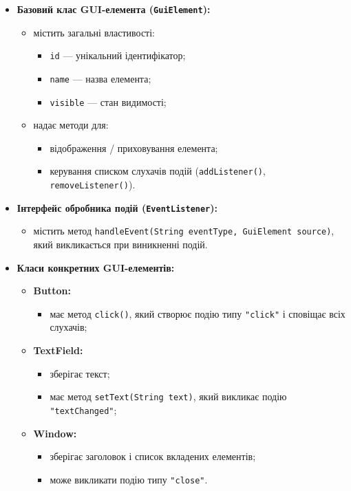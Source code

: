 \documentclass[12pt,a4paper]{article}
\begin{document}
    \begin{itemize}
    \item \textbf{Базовий клас GUI-елемента (\texttt{GuiElement}):}
    \begin{itemize}
        \item містить загальні властивості:
        \begin{itemize}
        \item \texttt{id} — унікальний ідентифікатор;
        \item \texttt{name} — назва елемента;
        \item \texttt{visible} — стан видимості;
        \end{itemize}
        \item надає методи для:
        \begin{itemize}
        \item відображення / приховування елемента;
        \item керування списком слухачів подій (\texttt{addListener()}, \texttt{removeListener()}).
        \end{itemize}
    \end{itemize}

    \item \textbf{Інтерфейс обробника подій (\texttt{EventListener}):}
    \begin{itemize}
        \item містить метод \texttt{handleEvent(String eventType, GuiElement source)}, який викликається при виникненні подій.
    \end{itemize}

    \item \textbf{Класи конкретних GUI-елементів:}
    \begin{itemize}
        \item \textbf{Button:}
        \begin{itemize}
        \item має метод \texttt{click()}, який створює подію типу \texttt{"click"} і сповіщає всіх слухачів;
        \end{itemize}
        \item \textbf{TextField:}
        \begin{itemize}
        \item зберігає текст;
        \item має метод \texttt{setText(String text)}, який викликає подію \texttt{"textChanged"};
        \end{itemize}
        \item \textbf{Window:}
        \begin{itemize}
        \item зберігає заголовок і список вкладених елементів;
        \item може викликати подію типу \texttt{"close"}.
        \end{itemize}
    \end{itemize}


\end{itemize}
\end{document}
